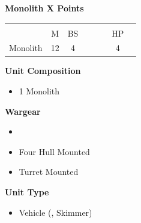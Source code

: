 \subsubsection[Monolith]{}
\hspace{0.5em}
\begin{minipage}[t]{0.72\textwidth}
	{\large \textbf{Monolith \dotfill X Points}}
	\begin{NiceTabular}{m{145 pt} *{2}{c} | *{3}{c} | c | c }
		& & &  & & & &  \\
		& M & BS &  &  &  & HP &  \\
		\hline
		Monolith & 12 & 4 &  &  &  & 4 & \\
	\end{NiceTabular}
	\small
	\begin{minipage}[t]{0.5\textwidth}
		\begin{flushleft}
			\vspace*{2em}
			\textbf{Unit Composition}
			\begin{itemize}
				\item 1 Monolith
			\end{itemize}
			
			\textbf{Wargear}
			\begin{itemize}
				\item {}
				\item Four Hull Mounted 
				\item Turret Mounted 
			\end{itemize}
		\end{flushleft}
	\end{minipage}
	\begin{minipage}[t]{0.5\textwidth}
		\begin{flushleft}
			\vspace*{2em}
			\textbf{Unit Type}
			\begin{itemize}
				\item Vehicle (\quickref{Living Metal}, Skimmer)
			\end{itemize}
			

\end{flushleft}
\end{minipage}
\end{minipage}
